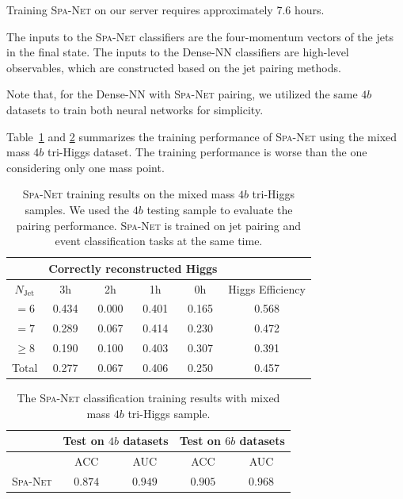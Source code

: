 \documentclass[12pt]{article}
\begin{document}
        Training \textsc{Spa-Net} on our server requires approximately 7.6 hours.

        The inputs to the \textsc{Spa-Net} classifiers are the four-momentum vectors of the jets in the final state. The inputs to the Dense-NN classifiers are high-level observables, which are constructed based on the jet pairing methods. 

        Note that, for the Dense-NN with \textsc{Spa-Net} pairing, we utilized the same $4b$ datasets to train both neural networks for simplicity.

        Table~\ref{tab:SPANet_triHiggs_4b_mix_1M_cls_pairing_results} and \ref{tab:SPANet_triHiggs_4b_mix_1M_cls_classification_results} summarizes the training performance of \textsc{Spa-Net} using the mixed mass $4b$ tri-Higgs dataset. The training performance is worse than the one considering only one mass point.
        \begin{table}[htpb]
            \centering
            \caption{\textsc{Spa-Net} training results on the mixed mass $4b$ tri-Higgs samples. We used the $4b$ testing sample to evaluate the pairing performance. \textsc{Spa-Net} is trained on jet pairing and event classification tasks at the same time.}
            \label{tab:SPANet_triHiggs_4b_mix_1M_cls_pairing_results}
            \begin{tabular}{c|cccc|c}
                           & \multicolumn{4}{c|}{Correctly reconstructed Higgs} &                  \\ \hline
            $N_\text{Jet}$ & 3h          & 2h         & 1h         & 0h         & Higgs Efficiency \\ \hline
            $=6$           & 0.434 & 0.000 & 0.401 & 0.165 & 0.568            \\
            $=7$           & 0.289 & 0.067 & 0.414 & 0.230 & 0.472            \\
            $\ge 8$        & 0.190 & 0.100 & 0.403 & 0.307 & 0.391            \\ \hline
            Total          & 0.277 & 0.067 & 0.406 & 0.250 & 0.457
            \end{tabular}
        \end{table}
        \begin{table}[htpb]
            \centering
            \caption{The \textsc{Spa-Net} classification training results with mixed mass $4b$ tri-Higgs sample.}
            \label{tab:SPANet_triHiggs_4b_mix_1M_cls_classification_results}
            \begin{tabular}{c|cc|cc}
                             & \multicolumn{2}{c|}{Test on $4b$ datasets}& \multicolumn{2}{c}{Test on $6b$ datasets} \\ \hline
                             & ACC                 & AUC                 & ACC                 & AUC                 \\ \hline
            \textsc{Spa-Net} & $0.874$             & $0.949$             & $0.905$             & $0.968$
            \end{tabular}
        \end{table}
\end{document}
